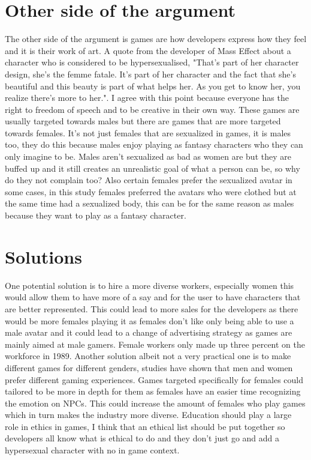 \documentclass{scrartcl}
\begin{document}
\section{Other side of the argument}
The other side of the argument is games are how developers express how they feel and it is their work of art. A quote from the developer of Mass Effect about a character who is considered to be hypersexualised, "That's part of her character design, she's the femme fatale. It's part of her character and the fact that she's beautiful and this beauty is part of what helps her. As you get to know her, you realize there's more to her."\cite{venturebeat}. I agree with this point because everyone has the right to freedom of speech and to be creative in their own way. These games are usually targeted towards males but there are games that are more targeted towards females\cite{bowey2017don}\cite{waern2005hypersexual}. \newline
It's not just females that are sexualized in games, it is males too\cite{heron2014sexism}, they do this because males enjoy playing as fantasy characters who they can only imagine to be. Males aren't sexualized as bad as women are but they are buffed up and it still creates an unrealistic goal of what a person can be, so why do they not complain too?
Also certain females prefer the sexualized avatar in some cases\cite{waern2005hypersexual}, in this study females preferred the avatars who were clothed but at the same time had a sexualized body, this can be for the same reason as males because they want to play as a fantasy character.

\section{Solutions}
One potential solution is to hire a more diverse workers, especially women \cite{smith2016understanding} this would allow them to have more of a say and for the user to have characters that are better represented. This could lead to more sales for the developers as there would be more females playing it as females don't like only being able to use a male avatar\cite{heron2014sexism} and it could lead to a change of advertising strategy as games are mainly aimed at male gamers\cite{waern2005hypersexual}. Female workers only made up three percent on the workforce in 1989\cite{pbs}. \newline
Another solution albeit not a very practical one is to make different games for different genders, studies have shown that men and women prefer different gaming experiences\cite{desai2016effects}. Games targeted specifically for females could tailored to be more in depth for them as females have an easier time recognizing the emotion on NPCs\cite{desai2016effects}. This could increase the amount of females who play games which in turn makes the industry more diverse. \newline
Education should play a large role in ethics in games\cite{lekka2014computer}, I think that an ethical list\cite{scavarelli2014cindr} should be put together so developers all know what is ethical to do and they don't just go and add a hypersexual character with no in game context.
\end{document}
